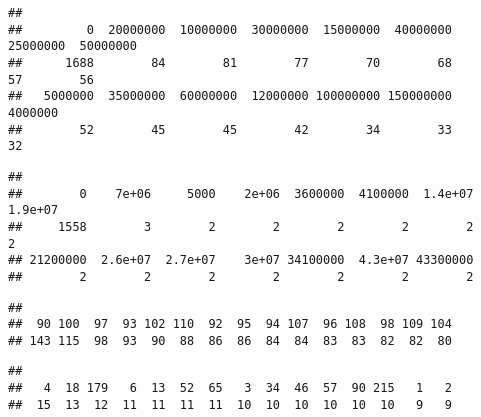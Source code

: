 \documentclass[
]{article}
\newenvironment{Shaded}{\begin{snugshade}}{\end{snugshade}}
\newcommand{\AttributeTok}[1]{\textcolor[rgb]{0.77,0.63,0.00}{#1}}
\newcommand{\ConstantTok}[1]{\textcolor[rgb]{0.00,0.00,0.00}{#1}}
\newcommand{\DecValTok}[1]{\textcolor[rgb]{0.00,0.00,0.81}{#1}}
\newcommand{\FunctionTok}[1]{\textcolor[rgb]{0.00,0.00,0.00}{#1}}
\newcommand{\NormalTok}[1]{#1}
\newcommand{\OtherTok}[1]{\textcolor[rgb]{0.56,0.35,0.01}{#1}}
\newcommand{\SpecialCharTok}[1]{\textcolor[rgb]{0.00,0.00,0.00}{#1}}
\begin{document}
\begin{verbatim}
## 
##         0  20000000  10000000  30000000  15000000  40000000  25000000  50000000 
##      1688        84        81        77        70        68        57        56 
##   5000000  35000000  60000000  12000000 100000000 150000000   4000000 
##        52        45        45        42        34        33        32
\end{verbatim}

\begin{Shaded}
\end{Shaded}

\begin{verbatim}
## 
##        0    7e+06     5000    2e+06  3600000  4100000  1.4e+07  1.9e+07 
##     1558        3        2        2        2        2        2        2 
## 21200000  2.6e+07  2.7e+07    3e+07 34100000  4.3e+07 43300000 
##        2        2        2        2        2        2        2
\end{verbatim}

\begin{Shaded}
\end{Shaded}

\begin{verbatim}
## 
##  90 100  97  93 102 110  92  95  94 107  96 108  98 109 104 
## 143 115  98  93  90  88  86  86  84  84  83  83  82  82  80
\end{verbatim}

\begin{Shaded}
\end{Shaded}

\begin{verbatim}
## 
##   4  18 179   6  13  52  65   3  34  46  57  90 215   1   2 
##  15  13  12  11  11  11  11  10  10  10  10  10  10   9   9
\end{verbatim}
\end{document}
